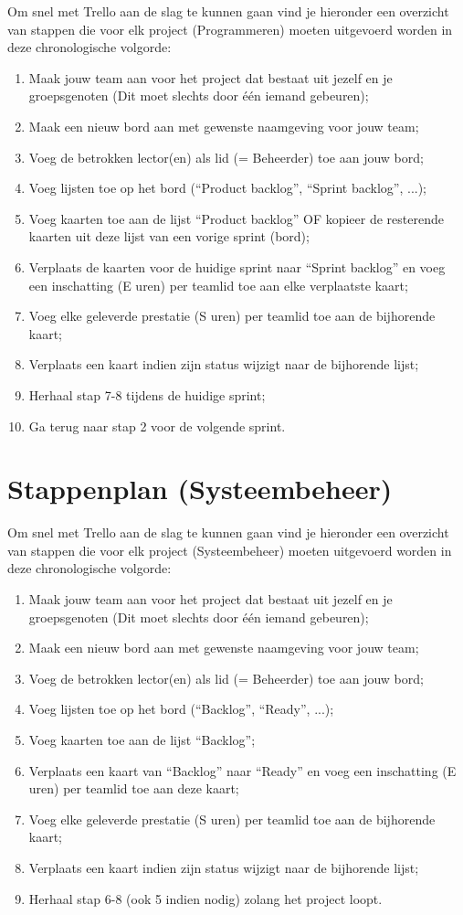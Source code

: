 Om snel met Trello aan de slag te kunnen gaan vind je hieronder een overzicht van stappen die voor elk project (Programmeren) moeten uitgevoerd worden in deze chronologische volgorde:
\begin{enumerate}[nolistsep]
	\item Maak jouw team aan voor het project dat bestaat uit jezelf en je groepsgenoten (Dit moet slechts door \'e\'en iemand gebeuren);
	\item Maak een nieuw bord aan met gewenste naamgeving voor jouw team;
	\item Voeg de betrokken lector(en) als lid (= Beheerder) toe aan jouw bord;
	\item Voeg lijsten toe op het bord (``Product backlog'', ``Sprint backlog'', ...);
	\item Voeg kaarten toe aan de lijst ``Product backlog'' OF kopieer de resterende kaarten uit deze lijst van een vorige sprint (bord);
	\item Verplaats de kaarten voor de huidige sprint naar ``Sprint backlog'' en voeg een inschatting (E uren) per teamlid toe aan elke verplaatste kaart;
	\item Voeg elke geleverde prestatie (S uren) per teamlid toe aan de bijhorende kaart;
	\item Verplaats een kaart indien zijn status wijzigt naar de bijhorende lijst;
	\item Herhaal stap 7-8 tijdens de huidige sprint;
	\item Ga terug naar stap 2 voor de volgende sprint.
\end{enumerate}

\section{Stappenplan (Systeembeheer)}

Om snel met Trello aan de slag te kunnen gaan vind je hieronder een overzicht van stappen die voor elk project (Systeembeheer) moeten uitgevoerd worden in deze chronologische volgorde:
\begin{enumerate}[nolistsep]
	\item Maak jouw team aan voor het project dat bestaat uit jezelf en je groepsgenoten (Dit moet slechts door \'e\'en iemand gebeuren);
	\item Maak een nieuw bord aan met gewenste naamgeving voor jouw team;
	\item Voeg de betrokken lector(en) als lid (= Beheerder) toe aan jouw bord;
	\item Voeg lijsten toe op het bord (``Backlog'', ``Ready'', ...);
	\item Voeg kaarten toe aan de lijst ``Backlog'';
	\item Verplaats een kaart van ``Backlog'' naar ``Ready'' en voeg een inschatting (E uren) per teamlid toe aan deze kaart;
	\item Voeg elke geleverde prestatie (S uren) per teamlid toe aan de bijhorende kaart;
	\item Verplaats een kaart indien zijn status wijzigt naar de bijhorende lijst;
	\item Herhaal stap 6-8 (ook 5 indien nodig) zolang het project loopt.
\end{enumerate}